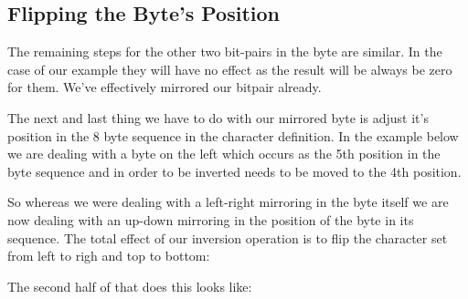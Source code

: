 \subsection{Flipping the Byte's Position}
The remaining steps for the other two bit-pairs in the byte are similar. In the case of our
example they will have no effect as the result will be always be zero for them. We've
effectively mirrored our bitpair already.

The next and last thing we have to do with our mirrored byte is adjust it's position in the 8 byte sequence
in the character definition. In the example below we are dealing with a byte on
the left which occurs as the 5th position in the byte sequence and in order to be
inverted needs to be moved to the 4th position.

So whereas we were dealing with a left-right mirroring in the byte itself we are now dealing with an up-down
mirroring in the position of the byte in its sequence. The total effect of our inversion operation is
to flip the character set from left to righ and top to bottom:

\begin{figure}[H]
{
  \setlength{\tabcolsep}{3.0pt}
  \setlength\cmidrulewidth{\heavyrulewidth} %
    \begin{adjustbox}{width=10cm,center}
  \begin{subfigure}{0.3\textwidth}
  
  \end{subfigure}
  \begin{subfigure}{0.3\textwidth}
  
  \end{subfigure}
  \end{adjustbox}
}\caption[]{}
\end{figure}

The second half of  that does this looks like:

